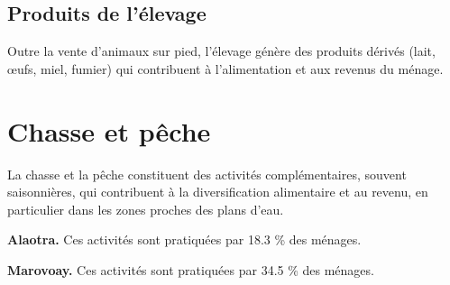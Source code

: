\documentclass[
  french,
  letterpaper,
]{report}
\begin{document}
\subsection{Produits de l'élevage}\label{produits-de-luxe9levage}

Outre la vente d'animaux sur pied, l'élevage génère des produits dérivés
(lait, œufs, miel, fumier) qui contribuent à l'alimentation et aux
revenus du ménage.

\begin{table}

\caption{\label{tbl-produits-elevage}Produits de l'élevage : nombre de
ménages producteurs}


\end{table}%

\section{Chasse et pêche}\label{sec-chasse-peche}

La chasse et la pêche constituent des activités complémentaires, souvent
saisonnières, qui contribuent à la diversification alimentaire et au
revenu, en particulier dans les zones proches des plans d'eau.

\textbf{Alaotra.} Ces activités sont pratiquées par 18.3 \% des ménages.

\textbf{Marovoay.} Ces activités sont pratiquées par 34.5 \% des
ménages.
\end{document}
